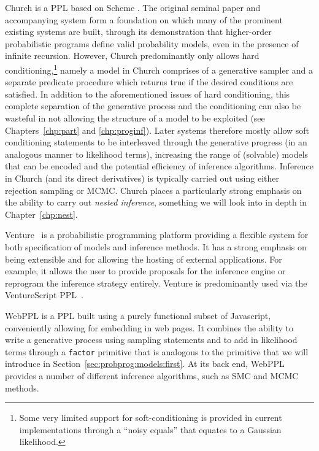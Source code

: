 Church is a PPL based on Scheme \citep{goodman_uai_2008}.  
The original seminal paper and accompanying system 
	form a foundation on which many of the prominent existing systems are built, through its
	demonstration that higher-order probabilistic programs define valid probability models, even in
	the presence of infinite recursion.  However, Church predominantly only allows hard
		conditioning,\footnote{Some very limited support for soft-conditioning is provided in current
		implementations through a ``noisy equals'' that equates to a Gaussian likelihood.}
	namely a model in Church comprises of a generative sampler and a separate predicate procedure
	which returns true if the desired conditions are satisfied.  
	In addition to the aforementioned issues of hard conditioning, this complete separation of the 
	generative process and the conditioning can also be wasteful in not allowing the structure of a 
	model to be exploited (see Chapters~\ref{chp:part} and \ref{chp:proginf}).  
	Later systems therefore mostly allow soft conditioning statements to be interleaved
	through the generative progress (in an analogous manner to likelihood terms), increasing the range
	of (solvable) models that can be encoded and the potential efficiency of inference algorithms.
	Inference in Church (and its direct derivatives) is typically carried out using either rejection sampling
	or MCMC.  Church places a particularly strong emphasis on the ability to carry out \emph{nested inference},
	something we will look into in depth in Chapter~\ref{chp:nest}.

Venture~\citep{mansinghka2014venture} is a probabilistic programming platform providing a flexible
system for both specification of models and inference methods.  It has a strong emphasis on being extensible
and for allowing the hosting of external applications.  For example, it allows the user to provide proposals for
the inference engine or reprogram the inference strategy entirely.  Venture is predominantly used via the
VentureScript PPL~\citep{mansinghka2014venture}.

WebPPL \citep{goodman_book_2014} is a PPL built using a purely functional subset of Javascript,
conveniently allowing for embedding in web pages.
It combines the ability to write a generative process using sampling statements and to add in likelihood
terms through a {\small \texttt{factor}} primitive that is analogous to the \observe primitive that we will introduce
in Section~\ref{sec:probprog:models:first}.  At its back end, WebPPL provides a number of different inference
algorithms, such as SMC and MCMC methods.

